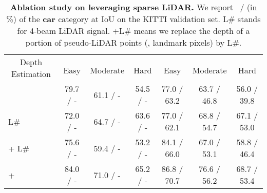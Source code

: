 \begin{table*}[!htb]
	\centering
	\caption{\textbf{Ablation study on leveraging sparse LiDAR.} We report \APBEV ~/ \AP (in \%) of the \textbf{car} category at IoU on the KITTI validation set. L\# stands for 4-beam LiDAR signal. \SDN+L\# means we replace the depth of a portion of pseudo-LiDAR points (\ie, landmark pixels) by L\#. \label{stbl:ablation_lidar}}
	\tabcolsep 2.5pt
	\begin{tabular}{l|c|c|c|c|c|c}
		\hline
		\multicolumn{1}{c|}{\multirow{2}{*}{Depth Estimation}} &  \multicolumn{3}{c|}{\vPIXOR} & \multicolumn{3}{c}{\AVOD} \\ \cline{2-7}
		\multicolumn{1}{c|}{}  &  Easy        & Moderate   & Hard     & Easy        & Moderate   & Hard  \\ \hline
		\SDN    &  79.7 / - \hspace{10pt}   & 61.1 / - \hspace{10pt}  & 54.5 / - \hspace{10pt}  & 77.0 / 63.2 & 63.7 / 46.8 & 56.0 / 39.8  \\
		L\#    & 72.0 / - \hspace{10pt}  & 64.7 / - \hspace{10pt} & 63.6 / - \hspace{10pt}  & 77.0 / 62.1 & 68.8 / 54.7 & 67.1 / 53.0  \\
		\SDN + L\#   & 75.6 / - \hspace{10pt}  & 59.4 / - \hspace{10pt} & 53.2 / - \hspace{10pt}  & 84.1 / 66.0 & 67.0 / 53.1 & 58.8 / 46.4  \\
		\SDN + \GDC    & 84.0 / - \hspace{10pt}  & 71.0 / - \hspace{10pt} & 65.2 / - \hspace{10pt}  & 86.8 / 70.7 & 76.6 / 56.2 & 68.7 / 53.4  \\ \hline
	\end{tabular}
\end{table*}

